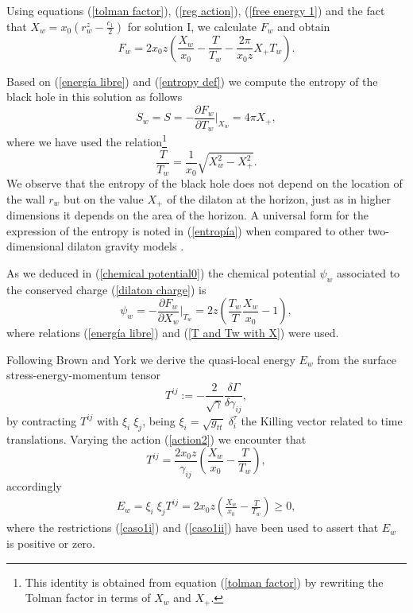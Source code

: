 \documentclass[sn-mathphys,Numbered]{sn-jnl}%
\theoremstyle{thmstyleone}%
\theoremstyle{thmstyletwo}%
\theoremstyle{thmstylethree}%
\begin{document}
Using equations (\ref{tolman factor}), (\ref{reg action}), (\ref{free energy 1}) and the fact that $X_w=x_0\left(r_{w}^z-\frac{c_1}{2}\right)$ for solution I, we calculate $F_w$ and obtain
%
\begin{equation}\label{energía libre}
    F_w=2x_0 z\left(\frac{X_w}{x_0}-\frac{T}{T_w}-\frac{2\pi}{x_0 z}X_+ T_w\right).
\end{equation}
%

Based on (\ref{energía libre}) and (\ref{entropy def}) we compute the entropy of the black hole in this solution as follows
%
\begin{equation}\label{entropía}
    S_w= S=-\frac{\partial F_w}{\partial T_w}\bigg\rvert_{X_w}= 4\pi X_+,
\end{equation}
%
where we have used the relation\footnote{This identity is obtained from equation (\ref{tolman factor}) by rewriting the Tolman factor in terms of $X_w$ and $X_+$.}
%
\begin{equation} \label{T and Tw with X}
\frac{T}{T_w}= \frac{1}{x_0}\sqrt{X_{w}^2-X_{+}^2}.
\end{equation}
%
We observe that the entropy of the black hole does not depend on the location of the wall $r_w$ but on the value $X_+$ of the dilaton at the horizon, just as in higher dimensions it depends on the area of the horizon. A universal form for the expression of the entropy is noted in (\ref{entropía}) when compared to other two-dimensional dilaton gravity models \cite{Grumiller,Davis,Nappi}.

As we deduced in (\ref{chemical potential0}) the chemical potential $\psi_w$ associated to the conserved charge (\ref{dilaton charge}) is 
%
\begin{equation}\label{potencial químico}
    \psi_w=-\frac{\partial F_w}{\partial X_w}\bigg\rvert_{T_w}=2z \left( \frac{T_w}{T}\frac{X_w}{x_0}-1\right),
\end{equation}
where relations (\ref{energía libre}) and (\ref{T and Tw with X}) were used. 

Following Brown and York \cite{Brown} we derive the quasi-local energy $E_w$ from the surface stress-energy-momentum tensor 
%
\begin{equation} \label{Brown stress tensor}
    T^{ij}:=- \frac{2}{\sqrt{\gamma}} \frac{\delta \Gamma}{\delta \gamma_{ij}},
\end{equation}
 by contracting $T^{ij}$ with $\xi_i\;\xi_j$, being $\xi_{i}=\sqrt{g_{tt}}\; \delta^\tau_{i}$ the Killing vector related to time translations. Varying the action (\ref{action2}) we encounter that
\begin{equation}
    T^{ij}=\frac{2x_0z}{\gamma_{ij}}\left(\frac{X_w}{x_0}-\frac{T}{T_w}\right),
\end{equation}
accordingly
%
\begin{equation}\label{internal energy}
\begin{aligned}
    E_w=\xi_i\;\xi_j T^{ij}=2x_0z\left(\frac{X_w}{x_0}-\frac{T}{T_w}\right) \geq 0,
\end{aligned}    
\end{equation}
where the restrictions (\ref{caso1i}) and (\ref{caso1ii}) have been used to assert that $E_w$ is positive or zero.
\end{document}
